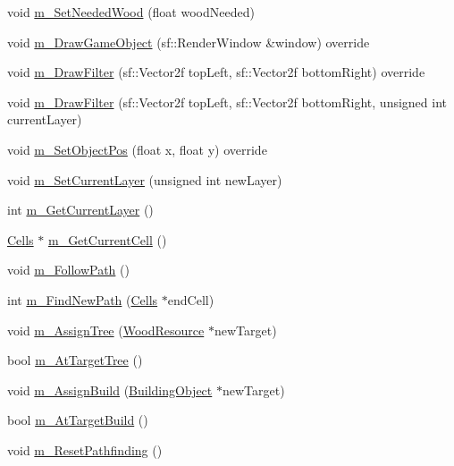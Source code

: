 \begin{DoxyCompactItemize}
void \mbox{\hyperlink{class_colonist_acc420a406fbf716b24447baaeadb9136}{m\+\_\+\+Set\+Needed\+Wood}} (float wood\+Needed)
\item 
void \mbox{\hyperlink{class_colonist_ae7d7c74ff639334e6992142c01dd8f6f}{m\+\_\+\+Draw\+Game\+Object}} (sf\+::\+Render\+Window \&window) override
\item 
void \mbox{\hyperlink{class_colonist_a77963df06b74b1235341e235ba7b320e}{m\+\_\+\+Draw\+Filter}} (sf\+::\+Vector2f top\+Left, sf\+::\+Vector2f bottom\+Right) override
\item 
void \mbox{\hyperlink{class_colonist_a2cdc11f7d868611172ed36f67ea1393f}{m\+\_\+\+Draw\+Filter}} (sf\+::\+Vector2f top\+Left, sf\+::\+Vector2f bottom\+Right, unsigned int current\+Layer)
\item 
void \mbox{\hyperlink{class_colonist_a4dd53225a89bab611509a4d8fc0c2fb1}{m\+\_\+\+Set\+Object\+Pos}} (float x, float y) override
\item 
void \mbox{\hyperlink{class_colonist_a5baacaaf37c94daeb2a1ab21c8d9e42a}{m\+\_\+\+Set\+Current\+Layer}} (unsigned int new\+Layer)
\item 
int \mbox{\hyperlink{class_colonist_a8b03eca0f0e0cafcb2c1fd581b75b0a6}{m\+\_\+\+Get\+Current\+Layer}} ()
\item 
\mbox{\hyperlink{class_cells}{Cells}} $\ast$ \mbox{\hyperlink{class_colonist_a25bd76dec060d9bb7ee0b0d35f400443}{m\+\_\+\+Get\+Current\+Cell}} ()
\item 
void \mbox{\hyperlink{class_colonist_a350c571eddc4b145e0d05cce1668f76c}{m\+\_\+\+Follow\+Path}} ()
\item 
int \mbox{\hyperlink{class_colonist_a81892e1468ec705e99ba71c6e9ae3da3}{m\+\_\+\+Find\+New\+Path}} (\mbox{\hyperlink{class_cells}{Cells}} $\ast$end\+Cell)
\item 
void \mbox{\hyperlink{class_colonist_a87de13e9cf6d11006b46b60c220854e1}{m\+\_\+\+Assign\+Tree}} (\mbox{\hyperlink{class_wood_resource}{Wood\+Resource}} $\ast$new\+Target)
\item 
bool \mbox{\hyperlink{class_colonist_ad1a63535927eb3153249fd4081901311}{m\+\_\+\+At\+Target\+Tree}} ()
\item 
void \mbox{\hyperlink{class_colonist_a18c45b63f78136d73efcd67e92b06a73}{m\+\_\+\+Assign\+Build}} (\mbox{\hyperlink{class_building_object}{Building\+Object}} $\ast$new\+Target)
\item 
bool \mbox{\hyperlink{class_colonist_a385c46942c09d4824da79aec97ab6149}{m\+\_\+\+At\+Target\+Build}} ()
\item 
void \mbox{\hyperlink{class_colonist_ad137e98744bc418674f853a0c19d72a3}{m\+\_\+\+Reset\+Pathfinding}} ()

\end{DoxyCompactItemize}
